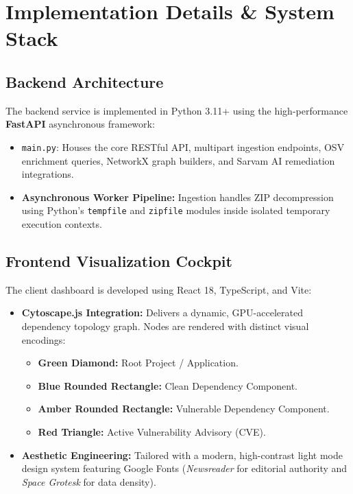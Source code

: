 \documentclass[12pt,a4paper,oneside]{report}
\begin{document}
\chapter{Implementation Details \& System Stack}

\section{Backend Architecture}
The backend service is implemented in Python 3.11+ using the high-performance \textbf{FastAPI} asynchronous framework:
\begin{itemize}
    \item \texttt{main.py}: Houses the core RESTful API, multipart ingestion endpoints, OSV enrichment queries, NetworkX graph builders, and Sarvam AI remediation integrations.
    \item \textbf{Asynchronous Worker Pipeline:} Ingestion handles ZIP decompression using Python's \texttt{tempfile} and \texttt{zipfile} modules inside isolated temporary execution contexts.
\end{itemize}

\section{Frontend Visualization Cockpit}
The client dashboard is developed using React 18, TypeScript, and Vite:
\begin{itemize}
    \item \textbf{Cytoscape.js Integration:} Delivers a dynamic, GPU-accelerated dependency topology graph. Nodes are rendered with distinct visual encodings:
    \begin{itemize}[noitemsep]
        \item \textbf{Green Diamond:} Root Project / Application.
        \item \textbf{Blue Rounded Rectangle:} Clean Dependency Component.
        \item \textbf{Amber Rounded Rectangle:} Vulnerable Dependency Component.
        \item \textbf{Red Triangle:} Active Vulnerability Advisory (CVE).
    \end{itemize}
    \item \textbf{Aesthetic Engineering:} Tailored with a modern, high-contrast light mode design system featuring Google Fonts (\textit{Newsreader} for editorial authority and \textit{Space Grotesk} for data density).
\end{itemize}
\end{document}
